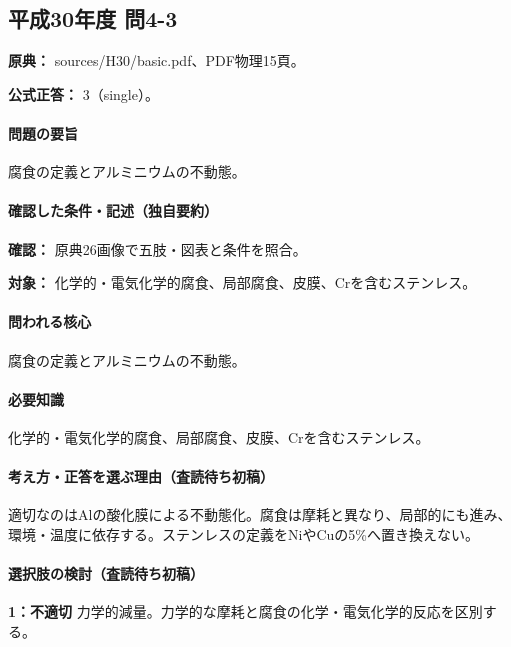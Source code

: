 \subsection{平成30年度 問4-3}
\label{q:h30-reg-basic-4-3}

\noindent\textbf{原典：} sources/H30/basic.pdf、PDF物理15頁。

\textbf{公式正答：} 3（single）。

\paragraph{問題の要旨} 腐食の定義とアルミニウムの不動態。

\paragraph{確認した条件・記述（独自要約）}\mbox{}\par

\noindent\textbf{確認：} 原典26画像で五肢・図表と条件を照合。\par

\noindent\textbf{対象：} 化学的・電気化学的腐食、局部腐食、皮膜、Crを含むステンレス。\par

\paragraph{問われる核心} 腐食の定義とアルミニウムの不動態。

\paragraph{必要知識} 化学的・電気化学的腐食、局部腐食、皮膜、Crを含むステンレス。

\paragraph{考え方・正答を選ぶ理由（査読待ち初稿）} 適切なのはAlの酸化膜による不動態化。腐食は摩耗と異なり、局部的にも進み、環境・温度に依存する。ステンレスの定義をNiやCuの5\%へ置き換えない。

\paragraph{選択肢の検討（査読待ち初稿）}\mbox{}\par

\noindent\textbf{1：不適切} 力学的減量。力学的な摩耗と腐食の化学・電気化学的反応を区別する。\par

